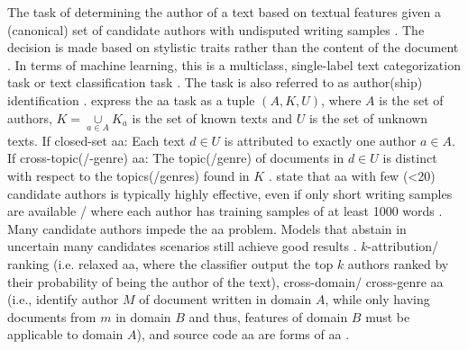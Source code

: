 \begin{definition}
    [\ac{aa}]   %
    The task of determining the author of a text based on textual features 
    given a (canonical) set of candidate authors with undisputed writing samples 
    \cite{stein_intrinsic_2011,koppel_authorship_2004,stamatatos_survey_2009,tyo_state_2022,bischoff_importance_2020,barlas_cross_domain_2020,altakrori_topic_2021,bevendorff_divergence_based_2020,elmanarelbouanani_authorship_2014,abbasi_writeprints_2008,llm_detection_av_2025,neal_surveying_2018}.
    The decision is made based on stylistic traits rather than the content of the document \cite{neal_surveying_2018}.
    In terms of machine learning, this is a multiclass, single-label text categorization task 
    \cite{stamatatos_survey_2009,koppel_authorship_2004,elmanarelbouanani_authorship_2014} 
    or text classification task \cite{elmanarelbouanani_authorship_2014}.
    The task is also referred to as author(ship) identification \cite{stamatatos_survey_2009,elmanarelbouanani_authorship_2014}.
    \citet{barlas_cross_domain_2020} express the \ac{aa} task as a tuple $(A,K,U)$, 
    where $A$ is the set of authors, $K=\underset{a\in A}{\cup}K_a$ is the set of known texts and $U$ is the set of unknown texts.
    If closed-set \ac{aa}: Each text $d \in U$ is attributed to exactly one author $a \in A$.
    If cross-topic(/-genre) \ac{aa}: The topic(/genre) of documents in $d \in U$ is distinct 
    with respect to the topics(/genres) found in $K$ \cite{barlas_cross_domain_2020}. 
    \citet{llm_detection_av_2025,neal_surveying_2018} state that \ac{aa} with few (<20) candidate authors is typically highly effective, 
    even if only short writing samples are available \cite{llm_detection_av_2025}/ 
    where each author has training samples of at least 1000 words \cite{neal_surveying_2018}.
    Many candidate authors impede the \ac{aa} problem.
    Models that abstain in uncertain many candidates scenarios still achieve good results \cite{llm_detection_av_2025}.
    $k$-attribution/ ranking (i.e. relaxed \ac{aa}, where the classifier output the top $k$ authors ranked by their probability of being the author of the text), 
    cross-domain/ cross-genre \ac{aa} (i.e., identify author $M$ of document written in domain $A$, while only having documents from $m$ in domain $B$ and thus, 
    features of domain $B$ must be applicable to domain $A$), 
    and source code \ac{aa} 
    are forms of \ac{aa} \cite{neal_surveying_2018}.
\end{definition}

